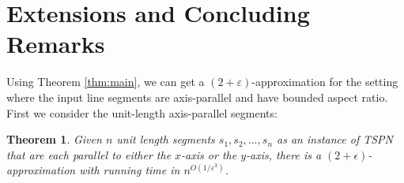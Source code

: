 \documentclass[10pt,a4paper]{amsart}
\theoremstyle{thmstyleone}
\newtheorem{theorem}{Theorem}
\newcommand{\eps}{\varepsilon}
\begin{document}
\section{Extensions and Concluding Remarks}\label{sec:conclusion}

Using Theorem \ref{thm:main}, we can get a $(2+\eps)$-approximation for the setting where the input line segments are axis-parallel and have bounded aspect ratio. First we consider the unit-length axis-parallel segments:

\begin{theorem}
    Given $n$ unit length segments $s_1, s_2,\dots, s_n$ as an instance of TSPN that are each parallel to either the $x$-axis or the $y$-axis, there is a $(2+\epsilon)$-approximation with running time in $n^{O(1/\eps^3)}$.
\end{theorem}
\end{document}
